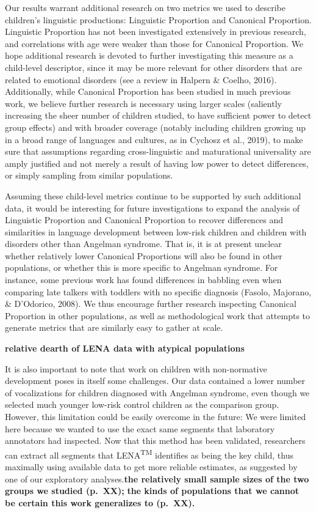 \documentclass[english,,man]{apa6}
\begin{document}
Our results warrant additional research on two metrics we used to describe children's linguistic productions: Linguistic Proportion and Canonical Proportion. Linguistic Proportion has not been investigated extensively in previous research, and correlations with age were weaker than those for Canonical Proportion. We hope additional research is devoted to further investigating this measure as a child-level descriptor, since it may be more relevant for other disorders that are related to emotional disorders (see a review in Halpern \& Coelho, 2016). Additionally, while Canonical Proportion has been studied in much previous work, we believe further research is necessary using larger scales (saliently increasing the sheer number of children studied, to have sufficient power to detect group effects) and with broader coverage (notably including children growing up in a broad range of languages and cultures, as in Cychosz et al., 2019), to make sure that assumptions regarding cross-linguistic and maturational universality are amply justified and not merely a result of having low power to detect differences, or simply sampling from similar populations.

Assuming these child-level metrics continue to be supported by such additional data, it would be interesting for future investigations to expand the analysis of Linguistic Proportion and Canonical Proportion to recover differences and similarities in language development between low-risk children and children with disorders other than Angelman syndrome. That is, it is at present unclear whether relatively lower Canonical Proportions will also be found in other populations, or whether this is more specific to Angelman syndrome. For instance, some previous work has found differences in babbling even when comparing late talkers with toddlers with no specific diagnosis (Fasolo, Majorano, \& D'Odorico, 2008). We thus encourage further research inspecting Canonical Proportion in other populations, as well as methodological work that attempts to generate metrics that are similarly easy to gather at scale.

\textbf{relative dearth of LENA data with atypical populations }

It is also important to note that work on children with non-normative development poses in itself some challenges. Our data contained a lower number of vocalizations for children diagnosed with Angelman syndrome, even though we selected much younger low-risk control children as the comparison group. However, this limitation could be easily overcome in the future: We were limited here because we wanted to use the exact same segments that laboratory annotators had inspected. Now that this method has been validated, researchers can extract all segments that LENA\textsuperscript{TM} identifies as being the key child, thus maximally using available data to get more reliable estimates, as suggested by one of our exploratory analyses.\textbf{the relatively small sample sizes of the two groups we studied (p.~XX);}
\textbf{the kinds of populations that we cannot be certain this work generalizes to (p.~XX).}
\end{document}
